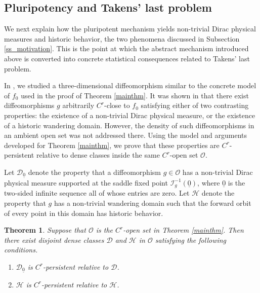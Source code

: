 \documentclass{amsart}
\newtheorem{thm}{Theorem}[section]
\theoremstyle{definition}
\numberwithin{equation}{section}
\numberwithin{figure}{section}
\begin{document}
\subsection{Pluripotency and Takens' last problem}

We next explain how the pluripotent mechanism yields non-trivial Dirac physical measures and historic behavior, the two phenomena discussed in Subsection \ref{ss_motivation}. 
This is the point at which the abstract mechanism introduced above is converted into concrete statistical consequences related to Takens' last problem.

In \cite{KNS23}, we studied a three-dimensional diffeomorphism similar to the concrete model of $f_0$ used in the proof of Theorem \ref{mainthm}. 
It was shown in \cite[Theorem A]{KNS23} that there exist diffeomorphisms $g$ arbitrarily $C^{r}$-close to $f_0$ satisfying either of two contrasting properties: the existence of a non-trivial Dirac physical measure, or the existence of a historic wandering domain. 
However, the density of such diffeomorphisms in an ambient open set was not addressed there. 
Using the model and arguments developed for Theorem \ref{mainthm}, we prove that these properties are $C^{r}$-persistent relative to dense classes inside the same $C^r$-open set $\mathcal{O}$.

Let $\mathscr{D}_{\underline{0}}$ denote the property that a diffeomorphism $g\in \mathcal{O}$ has a non-trivial Dirac physical measure supported at the saddle fixed point $\mathcal{I}_{g}^{-1}(\underline{0})$, where $\underline{0}$ is the two-sided infinite sequence all of whose entries are zero. 
Let $\mathscr{H}$ denote the property that $g$ has a non-trivial wandering domain such that the forward orbit of every point in this domain has historic behavior.

\begin{thm}\label{DrcHst}
Suppose that $\mathcal{O}$ is the $C^{r}$-open set in Theorem \ref{mainthm}. 
Then there exist disjoint dense classes $\mathcal{D}$ and $\mathcal{H}$ in $\mathcal{O}$ satisfying the following conditions.
\begin{enumerate}[\rm (1)]
\item \label{DrcHst-1} $\mathscr{D}_{\underline{0}}$ is $C^{r}$-persistent relative to $\mathcal{D}$.
\item \label{DrcHst-2} $\mathscr{H}$ is $C^{r}$-persistent relative to $\mathcal{H}$.
\end{enumerate}
\end{thm}
\end{document}
